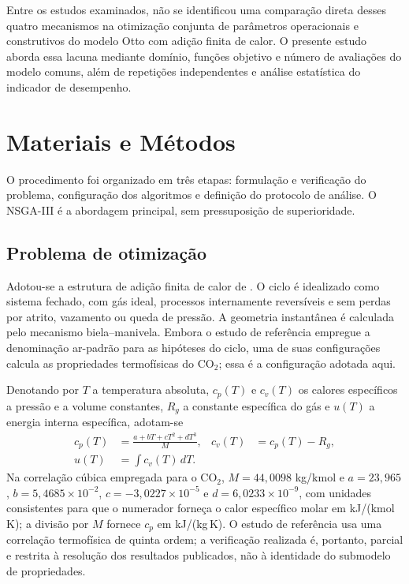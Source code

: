 \documentclass[a4paper,11pt]{article}
\begin{document}
Entre os estudos examinados, não se identificou uma comparação direta desses
quatro mecanismos na otimização conjunta de parâmetros operacionais e
construtivos do modelo Otto com adição finita de calor. O presente estudo
aborda essa lacuna mediante domínio, funções objetivo e número de avaliações
do modelo comuns, além de repetições independentes e análise estatística do
indicador de desempenho.

\section{Materiais e Métodos}\label{sec:metodos}

O procedimento foi organizado em três etapas: formulação e verificação do
problema, configuração dos algoritmos e definição do protocolo de análise. O
NSGA-III é a abordagem principal, sem pressuposição de superioridade.

\subsection{Problema de otimização}
\label{subsec:problema}

Adotou-se a estrutura de adição finita de calor de
\citet{naaktgeboren2017}. O ciclo é idealizado como sistema fechado, com gás
ideal, processos internamente reversíveis e sem perdas por atrito, vazamento ou
queda de pressão. A geometria instantânea é calculada pelo mecanismo
biela--manivela. Embora o estudo de referência empregue a denominação
ar-padrão para as hipóteses do ciclo, uma de suas configurações calcula as
propriedades termofísicas do CO$_2$; essa é a configuração adotada aqui.

Denotando por $T$ a temperatura absoluta, $c_p(T)$ e $c_v(T)$ os calores
específicos a pressão e a volume constantes, $R_g$ a constante específica do
gás e $u(T)$ a energia interna específica, adotam-se
\begin{equation}
\begin{aligned}
c_p(T)&=\frac{a+bT+cT^2+dT^3}{M},&
c_v(T)&=c_p(T)-R_g,\\
u(T)&=\int c_v(T)\,dT.
\end{aligned}
\label{eq:propriedades-gas}
\end{equation}
Na correlação cúbica empregada para o CO$_2$, $M=44{,}0098$ kg/kmol e
$a=23{,}965$, $b=5{,}4685\times10^{-2}$,
$c=-3{,}0227\times10^{-5}$ e $d=6{,}0233\times10^{-9}$, com unidades
consistentes para que o numerador forneça o calor específico molar em
kJ/(kmol\,K); a divisão por $M$ fornece $c_p$ em kJ/(kg\,K). O estudo de
referência usa uma correlação termofísica de quinta ordem; a verificação
realizada é, portanto, parcial e restrita à resolução dos resultados
publicados, não à identidade do submodelo de propriedades.
\end{document}
